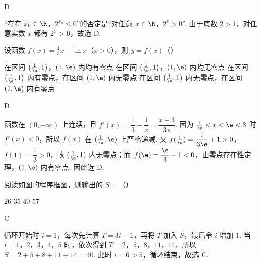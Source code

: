 \begin{answer}
D
\end{answer}

\begin{solution}
“存在 \(x_0\in\R\)，\(2^{x_0}\leqslant0\)”的否定是“对任意 \(x\in\R\)，\(2^x>0\)”. 由于底数 \(2>1\)，对任意实数 \(x\) 都有 \(2^x>0\)，故选 D.
\end{solution}

\begin{problem}
设函数 \( f(x) = \frac{1}{3} x - \ln x \)（\(x > 0\)），则 \( y = f(x) \)（\quad）

\choices
    {在区间 \(\left(\frac{1}{\e},1\right)\)，\(\left(1,\e\right)\) 内均有零点}
    {在区间 \(\left(\frac{1}{\e},1\right)\)，\(\left(1,\e\right)\) 内均无零点}
    {在区间 \(\left(\frac{1}{\e},1\right)\) 内有零点，在区间 \(\left(1,\e\right)\) 内无零点}
    {在区间 \(\left(\frac{1}{\e},1\right)\) 内无零点，在区间 \(\left(1,\e\right)\) 内有零点}
\end{problem}

\begin{answer}
D
\end{answer}

\begin{solution}
函数在 \((0,+\infty)\) 上连续，且 \(f'(x)=\dfrac{1}{3}-\dfrac{1}{x}=\dfrac{x-3}{3x}\). 因为 \(\frac{1}{\e}<x<\e<3\) 时 \(f'(x)<0\)，所以 \(f(x)\) 在 \((\frac{1}{\e},\e)\) 上严格递减. 又 \(f(\frac{1}{\e})=\dfrac{1}{3\e}+1>0\)，\(f(1)=\dfrac{1}{3}>0\)，故 \((\frac{1}{\e},1)\) 内无零点；而 \(f(\e)=\dfrac{\e}{3}-1<0\)，由零点存在性定理，\((1,\e)\) 内有零点. 因此选 D.
\end{solution}

\begin{problem}
阅读如图的程序框图，则输出的 \(S =\)（\quad）


\choices
    {\(26\)}
    {\(35\)}
    {\(40\)}
    {\(57\)}
\end{problem}

\begin{answer}
C
\end{answer}

\begin{solution}
循环开始时 \(i=1\)，每次先计算 \(T=3i-1\)，再将 \(T\) 加入 \(S\)，最后令 \(i\) 增加 \(1\). 当 \(i=1\)，\(2\)，\(3\)，\(4\)，\(5\) 时，依次得到 \(T=2\)，\(5\)，\(8\)，\(11\)，\(14\)，所以 \(S=2+5+8+11+14=40\). 此时 \(i=6>5\)，循环结束，故选 C.
\end{solution}

